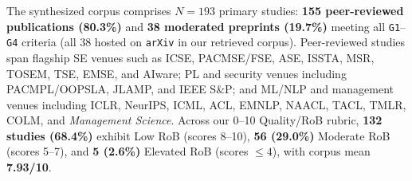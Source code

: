 \documentclass[10pt,twocolumn,a4paper]{article}
\begin{document}
The synthesized corpus comprises \textbf{$N = 193$} primary studies: \textbf{155 peer-reviewed publications (80.3\%)} and \textbf{38 moderated preprints (19.7\%)} meeting all \texttt{G1}--\texttt{G4} criteria (all 38 hosted on \texttt{arXiv} in our retrieved corpus). Peer-reviewed studies span flagship SE venues such as ICSE, PACMSE/FSE, ASE, ISSTA, MSR, TOSEM, TSE, EMSE, and AIware; PL and security venues including PACMPL/OOPSLA, JLAMP, and IEEE S\&P; and ML/NLP and management venues including ICLR, NeurIPS, ICML, ACL, EMNLP, NAACL, TACL, TMLR, COLM, and \emph{Management Science}. Across our 0--10 Quality/RoB rubric, \textbf{132 studies (68.4\%)} exhibit Low RoB (scores 8--10), \textbf{56 (29.0\%)} Moderate RoB (scores 5--7), and \textbf{5 (2.6\%)} Elevated RoB (scores $\le 4$), with corpus mean \textbf{7.93/10}.
\end{document}

